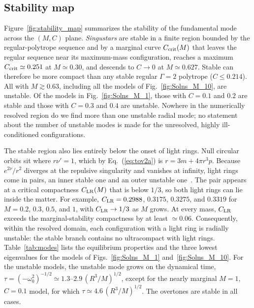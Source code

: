 \documentclass[%
 reprint,
 amsmath,amssymb,
 aps,prd,
 superscriptaddress,
]{revtex4-2}
\begin{document}
\subsection{Stability map}

Figure~\ref{fig:stability_map} summarizes the stability of the fundamental mode across the $(M,C)$ plane. \emph{Singustars} are stable in a finite region bounded by the regular-polytrope sequence and by a marginal curve $C_{\rm crit}(M)$ that leaves the regular sequence near its maximum-mass configuration, reaches a maximum $C_{\rm crit}\simeq0.251$ at $M\simeq0.30$, and descends to $C\to0$ at $M\simeq0.627$. Stable  can therefore be more compact than any stable regular $\Gamma=2$ polytrope ($C\le0.214$). All  with $M\gtrsim0.63$, including all the models of Fig.~\ref{fig:Solns_M_10}, are unstable. Of the models in Fig.~\ref{fig:Solns_M_1}, those with $C=0.1$ and $0.2$ are stable and those with $C=0.3$ and $0.4$ are unstable. Nowhere in the numerically resolved region do we find more than one unstable radial mode; no statement about the number of unstable modes is made for the unresolved, highly ill-conditioned configurations.

The stable region also lies entirely below the onset of light rings. Null circular orbits sit where $r\nu'=1$, which by Eq.~(\ref{eq:tov2a}) is $r=3m+4\pi r^3p$. Because $e^{2\nu}/r^2$ diverges at the repulsive singularity and vanishes at infinity, light rings come in pairs, an inner stable one and an outer unstable one~\cite{Cunha2017}. The pair appears at a critical compactness $C_{\rm LR}(M)$ that is below $1/3$, so both light rings can lie inside the matter. For example, $C_{\rm LR}=0.2988$, $0.3175$, $0.3275$, and $0.3319$ for $M=0.2$, $0.3$, $0.5$, and $1$, with $C_{\rm LR}\to1/3$ as $M$ grows. At every mass, $C_{\rm LR}$ exceeds the marginal-stability compactness by at least $\simeq0.06$. Consequently, within the resolved domain, each configuration with a light ring is radially unstable: the stable branch contains no ultracompact  with light rings. Table~\ref{tab:modes} lists the equilibrium properties and the three lowest eigenvalues for the models of Figs.~\ref{fig:Solns_M_1} and~\ref{fig:Solns_M_10}. For the unstable models, the unstable mode grows on the dynamical time, $\tau=(-\omega_0^2)^{-1/2}\simeq1.3$--$2.9\,(R^3/M)^{1/2}$, except for the nearly marginal $M=1$, $C=0.1$ model, for which $\tau\simeq4.6\,(R^3/M)^{1/2}$. The overtones are stable in all cases.
\end{document}
